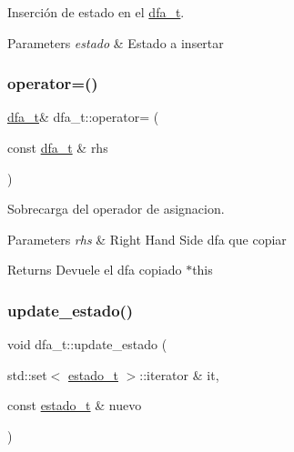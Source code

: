 Inserción de estado en el \hyperlink{classdfa__t}{dfa\+\_\+t}. 


\begin{DoxyParams}{Parameters}
{\em estado} & Estado a insertar \\
\hline
\end{DoxyParams}
\mbox{\label{classdfa__t_a803484b912714d5694ddf7f7d1193915}} 
\subsubsection{\texorpdfstring{operator=()}{operator=()}}
{\footnotesize\ttfamily \hyperlink{classdfa__t}{dfa\+\_\+t}\& dfa\+\_\+t\+::operator= (\begin{DoxyParamCaption}\item[{const \hyperlink{classdfa__t}{dfa\+\_\+t} \&}]{rhs }\end{DoxyParamCaption})\hspace{0.3cm}{\ttfamily [inline]}}



Sobrecarga del operador de asignacion. 


\begin{DoxyParams}{Parameters}
{\em rhs} & Right Hand Side dfa que copiar \\
\hline
\end{DoxyParams}
\begin{DoxyReturn}{Returns}
Devuele el dfa copiado $\ast$this 
\end{DoxyReturn}
\mbox{\label{classdfa__t_a84affce2b34a8290968eb089a14b773e}} 
\subsubsection{\texorpdfstring{update\+\_\+estado()}{update\_estado()}}
{\footnotesize\ttfamily void dfa\+\_\+t\+::update\+\_\+estado (\begin{DoxyParamCaption}\item[{std\+::set$<$ \hyperlink{classestado__t}{estado\+\_\+t} $>$\+::iterator \&}]{it,  }\item[{const \hyperlink{classestado__t}{estado\+\_\+t} \&}]{nuevo }\end{DoxyParamCaption})}



